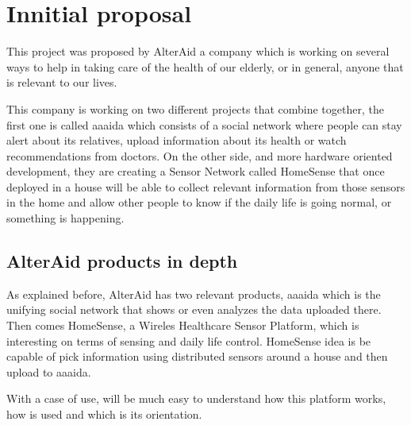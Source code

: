 \chapter{Innitial proposal}\label{C:innitial-proposal}
This project was proposed by AlterAid a company which is working on several ways to help in taking care of the health of our elderly, or in general, anyone that is relevant to our lives.

This company is working on two different projects that combine together, the first one is called aaaida which consists of a social network where people can stay alert about its relatives, upload information about its health or watch recommendations from doctors. On the other side, and more hardware oriented development, they are creating a Sensor Network called HomeSense that once deployed in a house will be able to collect relevant information from those sensors in the home and allow other people to know if the daily life is going normal, or something is happening.


\section{AlterAid products in depth}\label{S:alteraid-products}
As explained before, AlterAid has two relevant products, aaaida which is the unifying social network that shows or even analyzes
the data uploaded there. Then comes HomeSense, a Wireles Healthcare Sensor Platform, which is interesting on terms of sensing and daily life control. HomeSense idea is be capable of pick information using distributed sensors around a house and then upload to aaaida.

With a case of use, will be much easy to understand how this platform works, how is used and which is its orientation.

